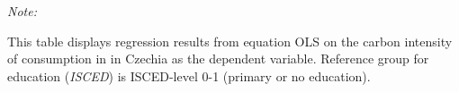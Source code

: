 \begin{table}[htbp!]
\begin{adjustbox}{width = 1\textwidth, max height = 0.95\textheight, center}
\begin{threeparttable}[b]
         \begin{tablenotes}\item \medskip \textit{Note:}
            \item This table displays regression results from equation OLS on the carbon intensity of consumption in  in Czechia as the dependent variable. Reference group for education (\textit{ISCED}) is ISCED-level 0-1 (primary or no education).
         \end{tablenotes}
      \end{threeparttable}
   \end{adjustbox}
\end{table}


